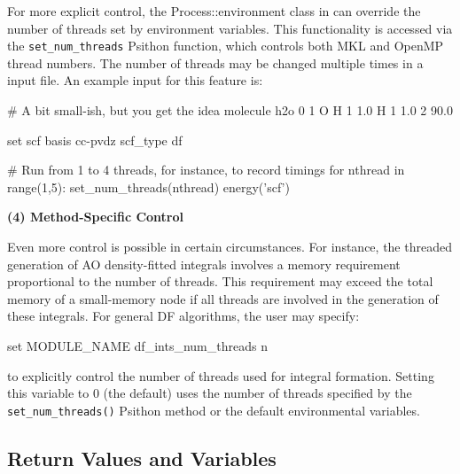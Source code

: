 For more explicit control, the Process::environment class in \PSIfour can
override the number of threads set by environment variables. This functionality
is accessed via the \texttt{set\_num\_threads} Psithon function, which controls
both MKL and OpenMP thread numbers. The number of threads may be changed
multiple times in a \PSIfour input file. An example input for this feature is:

\begin{Snippet}
# A bit small-ish, but you get the idea
molecule h2o {
0 1
O
H 1 1.0
H 1 1.0 2 90.0
}

set scf {
basis cc-pvdz
scf_type df
}

# Run from 1 to 4 threads, for instance, to record timings
for nthread in range(1,5):
    set_num_threads(nthread)
    energy('scf')
\end{Snippet}

\flushleft \textbf{(4) Method-Specific Control}

Even more control is possible in certain circumstances. For instance, the
threaded generation of AO density-fitted integrals involves a memory requirement
proportional to the number of threads. This requirement may exceed the total
memory of a small-memory node if all threads are involved in the generation of
these integrals. For general DF algorithms, the user may specify:

\begin{Snippet}
set MODULE_NAME df_ints_num_threads n 
\end{Snippet}

to explicitly control the number of threads used for integral formation. Setting
this variable to 0 (the default) uses the number of threads specified by the
\texttt{set\_num\_threads()} Psithon method or the default environmental variables.

\subsection{Return Values and \PSI Variables}

